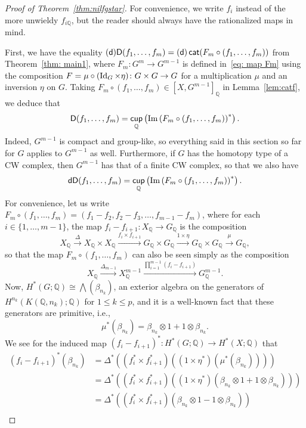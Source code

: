 \documentclass[amscd,amssymb,verbatim,10pt]{amsart}
\numberwithin{equation}{section}
\theoremstyle{plain}
\theoremstyle{definition}
\DeclareMathOperator{\cat}{{\mathsf{cat}}}
\DeclareMathOperator{\cu}{{\mathsf{cup}}}
\def\id{\protect\operatorname{Id}}
\def\Im{\protect\operatorname{Im}}
\def\Q{{\mathbb Q}}
\newcommand{\D}{{\sf {D}}}
\newcommand{\sd}{{(\sf {d})}}
\newcommand{\dD}{{\sf {dD}}}
\begin{document}
\begin{proof}[Proof of Theorem~\ref{thm:nilfgstar}]
For convenience, we write $f_i$ instead of the more unwieldy $f_{i\Q}$, but the
reader should always have the rationalized maps in mind.

First, we have the equality $\sd\D(f_1,\dots,f_m)=\sd\cat(F_m\circ (f_1,\dots,f_m))$ from Theorem~\ref{thm: main1}, 
where $F_m\colon G^m\to G^{m-1}$ is defined in~\eqref{eq: map Fm} using the composition $F=\mu\circ(\id_G\times\eta)\colon G\times G\to G$ for a multiplication $\mu$ and an 
inversion $\eta$ on $G$. Taking $F_m\circ (f_1,\dots,f_m)\in [X,G^{m-1}]_\Q$ in 
Lemma~\ref{lem:catf}, we deduce that
\[
\D(f_1,\dots,f_m)=\cu_\Q\left(\Im\left(F_m\circ (f_1,\dots,f_m)\right)^*\right).
\]
Indeed, $G^{m-1}$ is compact and group-like, so everything said in this section so far 
for $G$ applies to $G^{m-1}$ as well. 
Furthermore, if $G$ has the homotopy type of a CW complex, then $G^{m-1}$ has that of a 
finite CW complex, so that we also have
\[
\dD(f_1,\dots,f_m)=\cu_\Q\left(\Im\left(F_m\circ (f_1,\dots,f_m)\right)^*\right).
\]
For convenience, let us write $F_m\circ (f_1,\dots,f_m)=(f_1-f_2,f_2-f_3,\dots,f_{m-1}-f_m)$, where for each $i\in\{1,\dots,m-1\}$, the map $f_i-f_{i+1}\colon X_\Q\to G_\Q$ is the composition
\[
X _\Q \xrightarrow{\Delta}X _\Q\times X _\Q\xrightarrow{f_i\times f_{i+1}} G _\Q\times 
G _\Q\xrightarrow{1\times\eta} G _\Q\times G_\Q \xrightarrow{\mu} G _\Q,
\]
so that the map $F_m\circ (f_1,\dots,f_m)$
can also be seen simply as the composition
\begin{equation}\label{eq: writing Fm composition}
X _\Q \xrightarrow{\Delta_{m-1}} X^{m-1} _\Q \xrightarrow{\prod_{i=1}^{m-1}(f_i-f_{i+1})} 
G^{m-1} _\Q.
\end{equation}
Now, $H^*(G;\Q)\cong\bigwedge(\beta_{n_k})$, an exterior algebra on the generators 
of $H^{n_k}(K(\Q,n_k);\Q)$ for $1\le k\le p$, and it is a well-known fact that these generators are primitive, i.e.,
\[
\mu^*(\beta_{n_k}) = \beta_{n_k} \otimes 1 + 1 \otimes \beta_{n_k}.
\]
We see for the induced map $(f_i-f_{i+1})^*\colon H^*(G;\Q)\to H^*(X;\Q)$ that 
\begin{align*}
(f_i-f_{i+1})^*(\beta_{n_k}) & = \Delta^*((f_i^*\times f_{i+1}^*)((1\times \eta^*)(\mu^*(\beta_{n_k})))) \\
& = \Delta^*((f_i^*\times f_{i+1}^*)((1\times \eta^*)(\beta_{n_k} \otimes 1 + 1 \otimes \beta_{n_k}))) \\
& =  \Delta^*((f_i^*\times f_{i+1}^*)(\beta_{n_k} \otimes 1 - 1 \otimes \beta_{n_k})) \\

\end{align*}
\end{proof}
\end{document}
